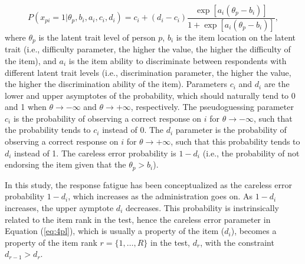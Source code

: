 \documentclass{svproc}
\begin{document}
\begin{equation}\label{eq:4pl}
	P(x_{pi}= 1| \theta_p, b_i, a_i, c_i, d_i) = c_i + (d_i -c_i) \dfrac{\exp[a_i(\theta_p - b_i)]}{1 + \exp[a_i(\theta_p - b_i)]},
\end{equation}
where $\theta_p$ is the latent trait level of person $p$, $b_i$ is the item location on the latent trait (i.e., difficulty parameter, the higher the value, the higher the difficulty of the item), and $a_i$ is the item ability to discriminate between respondents with different latent trait levels (i.e., discrimination parameter, the higher the value, the higher the discrimination ability of the item). Parameters $c_i$ and $d_i$ are the lower and upper asymptotes of the probability, which should naturally tend to 0 and 1 when $\theta \to - \infty$ and $\theta \to +\infty$, respectively. 
The pseudoguessing parameter $c_i$ is the probability of observing a correct response on $i$ for $\theta \to - \infty$, such that the probability tends to $c_i$ instead of 0. 
The $d_i$ parameter is the probability of observing a correct response on $i$ for $\theta \to + \infty$, such that this probability tends to $d_i$ instead of 1. The careless error probability is $1 - d_i$ (i.e., the probability of not endorsing the item given that the $\theta_p > b_i$).



In this study, the response fatigue has been conceptualized as the careless error probability $1 - d_i$, which increases as the administration goes on. As $1 - d_i$ increases, the upper aymptote $d_i$ decreases.
This probability is instrinsically related to the item rank in the test, hence the careless error parameter in Equation (\ref{eq:4pl}), which is usually a property of the item ($d_i$), becomes a property of the item rank $r = \{1, \ldots, R\}$ in the test, $d_r$, with the constraint $d_{r-1} > d_r$. 
\end{document}
